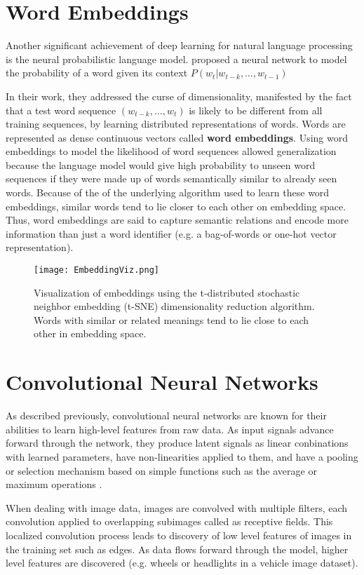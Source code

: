 \section{Word Embeddings}
Another significant achievement of deep learning for natural language processing is the neural probabilistic language model. \cite{bengio2003neural}
proposed a neural network to model the probability of a word given its context
$P(w_t|w_{t-k},\dots,w_{t-1})$

In their work, they addressed the curse of dimensionality, manifested by the fact that a test word sequence $(w_{t-k},\dots,w_{t})$
is likely to be different from all training sequences, by learning distributed representations of words. Words are represented as
dense continuous vectors called \textbf{word embeddings}.
Using word embeddings to model the likelihood of word sequences allowed generalization because the language model
would give high probability to unseen word sequences if they were made up of words semantically similar to already seen words.
Because of the of the underlying algorithm used to learn these word embeddings, similar words tend to lie closer to each other on
embedding space. Thus, word embeddings are said to capture semantic relations and encode more information than just a word identifier (e.g.
a bag-of-words or one-hot vector representation).

\begin{figure}[h]
\centering
\texttt{[image: EmbeddingViz.png]}
\caption{Visualization of embeddings using the t-distributed stochastic neighbor embedding (t-SNE) dimensionality reduction algorithm.
Words with similar or related meanings tend to lie close to each other in embedding space.}
\end{figure}

\section{Convolutional Neural Networks}
As described previously, convolutional neural networks are known for their abilities to learn high-level features from raw data. As input signals advance
forward through the network, they produce latent signals as linear conbinations with learned parameters, have non-linearities applied
to them, and have a pooling or selection mechanism based on simple functions such as the average or maximum operations \cite{zhou1988image}.

When dealing with image data, images are convolved with multiple filters, each convolution applied to overlapping subimages called as receptive fields.
This localized convolution process leads to discovery of low level features of images in the training set such as edges. As data
flows forward through the model, higher level features are discovered (e.g. wheels or headlights in a vehicle image dataset).

